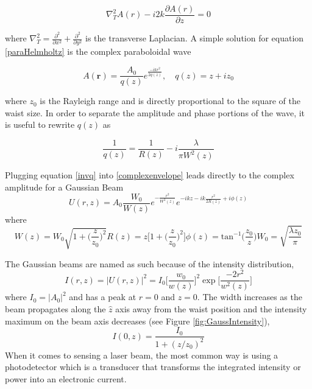 		\begin{equation}\label{paraHelmholtz}
		\nabla_T^2 A(r) - i2k \frac{\partial A(r)}{\partial z} = 0
		\end{equation}
		
		where $\nabla_T^2 = \frac{\partial^2}{\partial x^2} + \frac{\partial^2}{\partial y^2} $ is the transverse Laplacian.  A simple solution for equation \ref{paraHelmholtz} is the complex paraboloidal wave
		
		\begin{equation} \label{complexenvelope}
		A(\mathbf{r}) = \frac{A_0}{q(z)} e^{\frac{-ikr^2}{2q(z)}} , \quad q(z)=z+iz_0
		\end{equation}
		
		where $z_0$ is the Rayleigh range and is directly proportional to the square of the waist size.  In order to separate the amplitude and phase portions of the wave, it is useful to rewrite $q(z)$ as
		
		\begin{equation}\label{invq}
		\frac{1}{q(z)} = \frac{1}{R(z)} - i \frac{\lambda}{\pi W^2(z)}
		\end{equation} 
		
		Plugging equation \ref{invq} into \ref{complexenvelope} leads directly to the complex amplitude for a Gaussian Beam
		\begin{equation}
		U(r,z) = A_0 \frac{W_0}{W(z)} e^{-\frac{r^2}{W^2(z)}} e^{-ikz - ik \frac{r^2}{2R(z)} + i \phi(z)}
		\end{equation}
		where
		\begin{subequations}
		\begin{equation}
		W(z) = W_0 \sqrt{1 + \bigg( \frac{z}{z_0} \bigg)^2}
		\end{equation}
		\begin{equation}\label{ROC}
		R(z) = z \bigg[ 1 + \bigg( \frac{z}{z_0} \bigg)^2 \bigg]
		\end{equation}
		\begin{equation}\label{gouy}
		\phi(z)= \text{tan}^{-1}\bigg(\frac{z_0}{z}\bigg)
		\end{equation}
		\begin{equation}
		W_0 = \sqrt{\frac{\lambda z_0}{\pi}}
		\end{equation}
		\end{subequations}
	
		The Gaussian beams are named as such because of the intensity distribution,
		\begin{equation}
		I(r,z) = \vert U(r,z) |^2 = I_0 \bigg[ \frac{w_0}{w(z)}\bigg]^2 \exp \bigg[ \frac{-2 r^2}{w^2(z)}\bigg]
		\end{equation}
		where $I_0 = \vert A_0\vert^2$ and has a peak at $r=0$ and $z=0$.  The width increases as the beam propagates along the $\hat{z}$ axis away from the waist position and the intensity maximum on the beam axis decreases (see Figure \ref{fig:GaussIntensity}),
		\begin{equation}
		I(0,z) = \frac{I_0}{1 + (z/z_0)^2}
		\end{equation}
		When it comes to sensing a laser beam, the most common way is using a photodetector which is a transducer that transforms the integrated intensity or power into an electronic current.  
		
